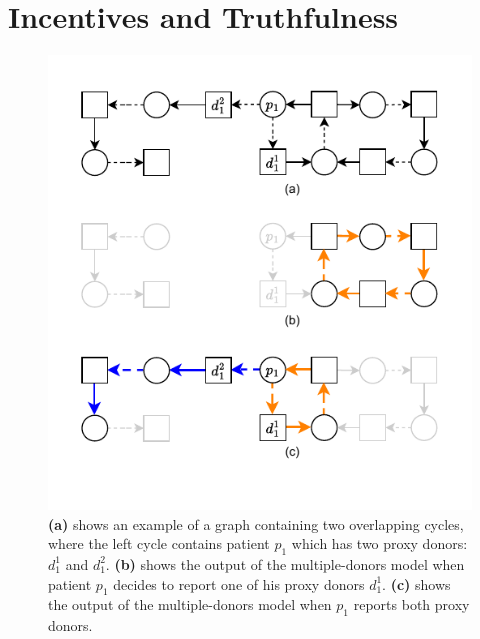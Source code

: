 \chapter{Incentives and Truthfulness}
\label{cha:incentives_and_truthfulness}

\begin{figure}
    \centering
    \includegraphics{data/incentive_motivation_example.pdf}
    \caption[An example showing the benefit of reporting two proxy donors in multiple-donors model]{\textbf{(a)} shows an example of a graph containing two overlapping cycles, where the left cycle contains patient $p_1$ which has two proxy donors: $d_1^1$ and $d_1^2$. \textbf{(b)} shows the output of the multiple-donors model when patient $p_1$ decides to report one of his proxy donors $d_1^1$. \textbf{(c)} shows the output of the multiple-donors model when $p_1$ reports both proxy donors.}
    \label{fig:incentive_motivation_example}
\end{figure}


